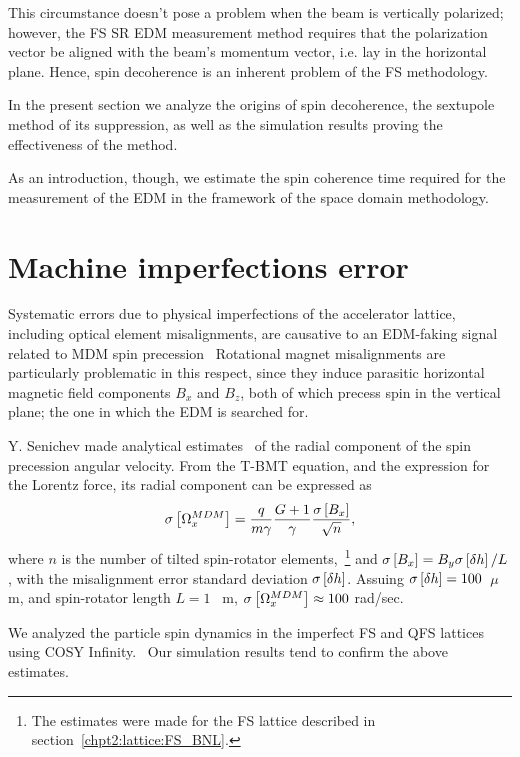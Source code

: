 This circumstance doesn't pose a problem when the beam is vertically polarized;
however, the FS SR EDM measurement method requires that the polarization vector be aligned with
the beam's momentum vector, i.e. lay in the horizontal plane. Hence, spin decoherence is an
inherent problem of the FS methodology.

In the present section we analyze the origins of spin decoherence,
the sextupole method of its suppression, as well as the simulation results
proving the effectiveness of the method.

As an introduction, though, we estimate the spin coherence time required for
the measurement of the EDM in the framework of the space domain methodology.



\section{Machine imperfections error}\label{chpt3:imperfections}
Systematic errors due to physical imperfections of the accelerator lattice, including
optical element misalignments, are causative to an EDM-faking signal 
related to MDM spin precession~\cite[p.~230]{Eremey:Thesis} Rotational magnet misalignments 
are particularly problematic in this respect, since they induce parasitic horizontal magnetic field
components $B_x$ and $B_z$, both of which precess spin in the vertical plane; the one in which
the EDM is searched for.

Y. Senichev made analytical estimates~\cite{Senichev:FDM}  of the radial component of
the spin precession angular velocity. From the T-BMT equation, and the expression for
the Lorentz force, its radial component can be expressed as 
\begin{equation}
\SD{\W_x^{MDM}} = \frac{q}{m\gamma}\frac{G+1}{\gamma}\frac{\SD{B_x}}{\sqrt{n}},
\end{equation}
where $n$ is the number of tilted spin-rotator elements,~\footnote{The estimates were made for
the FS lattice described in section~\ref{chpt2:lattice:FS_BNL}.} and $\SD{B_x} = B_y \SD{\delta h}/L$, 
with the misalignment error standard deviation $\SD{\delta h}$. Assuing $\SD{\delta h} = 100$~$\mu$m, 
and spin-rotator length $L=1$ ~m, $\SD{\W_x^{MDM}} \approx 100$ rad/sec.~\cite{Senichev:FDM}

We analyzed the particle spin dynamics in the imperfect FS and QFS lattices using COSY Infinity.~\cite{COSYINF:Website} 
Our simulation results tend to confirm the above estimates.

